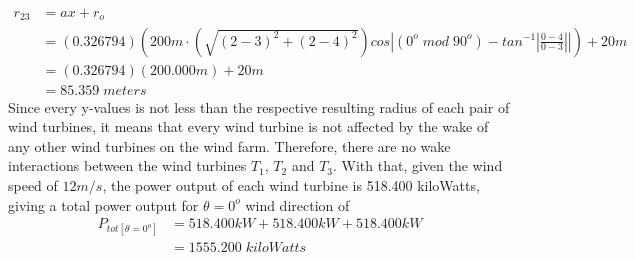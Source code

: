     \begin{align*}
        r_{23}
        &= ax+r_o \\
        &= (0.326794)\left( 200m\cdot \left( \sqrt{(2-3)^2+(2-4)^2} \right)cos \left| (0^o\;mod\;90^o) - tan^{-1}\left|\frac{0-4}{0-3}\right| \right| \right) + 20m \\
        &=(0.326794)(200.000m)+20m \\
        &= 85.359\;meters
    \end{align*}
    Since every y-values is not less than the respective resulting radius of each pair of wind turbines, it means that every wind turbine is not affected by the wake of any other wind turbines on the wind farm. Therefore, there are no wake interactions between the wind turbines $T_1$, $T_2$ and $T_3$. With that, given the wind speed of $12m/s$, the power output of each wind turbine is 518.400 kiloWatts, giving a total power output for $\theta=0^o$ wind direction of
	\begin{align*}
		P_{tot[\theta=0^o]} &= 518.400kW + 518.400kW + 518.400kW \\
		&=1555.200\;kiloWatts
	\end{align*}
    
